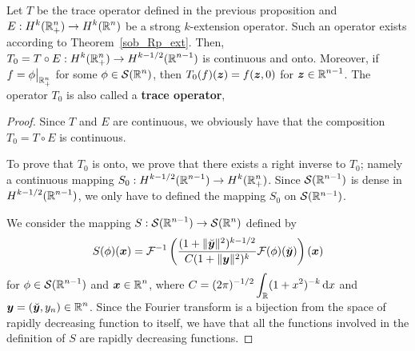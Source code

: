 \begin{theorem} \label{TraceT0}
Let $T$ be the trace operator defined in the previous proposition and
$\displaystyle E: H^k(\mathbb{R}^n_+) \to H^k(\mathbb{R}^n)$ be a strong
$k$-extension operator.  Such an operator exists according to
Theorem~\ref{sob_Rp_ext}.
Then, $\displaystyle T_0 = T \circ E:H^k(\mathbb{R}^n_+)
\rightarrow H^{k-1/2}(\mathbb{R}^{n-1})$ is continuous and onto.
Moreover, if $\displaystyle f = \phi\big|_{\mathbb{R}^n_+}$ for some
$\displaystyle \phi \in \mathcal{S}(\mathbb{R}^n)$, then
$T_0(f)({\bm{z}}) = f({\bm{z}},0)$ for $\displaystyle {\bm{z}} \in \mathbb{R}^{n-1}$.
The operator $T_0$ is also called a
{\bfseries trace operator},
\end{theorem}

\begin{proof}
Since $T$ and $E$ are continuous, we obviously have that the
composition $T_0 = T \circ E$ is continuous.

To prove that $T_0$ is onto, we prove that there exists a right
inverse to $T_0$; namely a continuous mapping
$\displaystyle S_0:H^{k-1/2}(\mathbb{R}^{n-1}) \to H^k(\mathbb{R}^n_+)$.
Since $\displaystyle \mathcal{S}(\mathbb{R}^{n-1})$ is dense in
$\displaystyle H^{k-1/2}(\mathbb{R}^{n-1})$,
we only have to defined the mapping $S_0$ on $\mathcal{S}(\mathbb{R}^{n-1})$.

We consider the mapping $\displaystyle S:\mathcal{S}(\mathbb{R}^{n-1}) \to \mathcal{S}(\mathbb{R}^n)$
defined by
\[
S(\phi)({\bm{x}}) = \mathcal{F}^{-1}\left(
\frac{(1+\|\breve{{\bm{y}}}\|^2)^{k-1/2}}{C (1+ \|{\bm{y}}\|^2)^k}
\mathcal{F}(\phi)(\breve{{\bm{y}}}) \right)({\bm{x}})
\]
for $\displaystyle \phi \in \mathcal{S}(\mathbb{R}^{n-1})$ and
$\displaystyle {\bm{x}} \in \mathbb{R}^n$, where
$\displaystyle C = (2\pi)^{-1/2} \int_{\mathbb{R}} (1+x^2)^{-k}\,\mathrm{d}{x}$ and
$\displaystyle {\bm{y}} = (\breve{{\bm{y}}},y_n) \in \mathbb{R}^n$.  Since the Fourier
transform is a bijection from the space of rapidly decreasing function
to itself, we have that all the functions involved in the definition
of $S$ are rapidly decreasing functions.


\end{proof}
